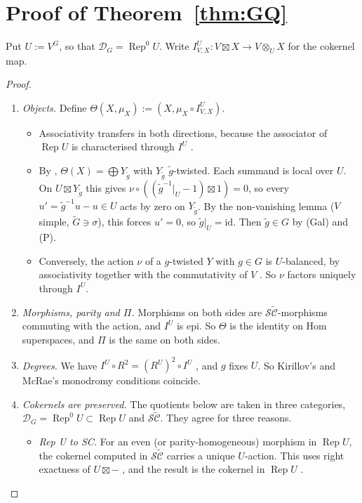 \documentclass[11pt]{article}
\theoremstyle{definition}
\newcommand{\cD}{\mathcal D}
\newcommand{\SC}{\mathcal S\widetilde{\mathcal C}}
\newcommand{\Rep}{\operatorname{Rep}}
\begin{document}
\section{Proof of Theorem~\ref{thm:GQ}}\label{sec:GQ}
Put $U:=V^G$, so that $\cD_G=\Rep^0U$. Write $I^U_{V,X}:V\boxtimes X\to V\otimes_UX$ for the
cokernel map.

\begin{proof}
\begin{enumerate}[nosep]
\item \emph{Objects.} Define $\Theta(X,\mu_X):=(X,\mu_X\circ I^U_{V,X})$.
\begin{itemize}[nosep]
\item Associativity transfers in both directions, because the associator of $\Rep U$ is
characterised through $I^U$ \cite[Thm~2.52]{CKM}.
\item By \cite[Thm~4.15(1)]{McR}, $\Theta(X)=\bigoplus Y_{\tilde g}$ with $Y_{\tilde g}$ $\tilde g$-twisted.
Each summand is local over $U$. On $U\boxtimes Y_{\tilde g}$ this gives
$\nu\circ((\tilde g^{-1}|_U-1)\boxtimes1)=0$, so every $u'=\tilde g^{-1}u-u\in U$ acts by zero on
$Y_{\tilde g}$. By the non-vanishing lemma \cite[Lemma~4.18]{McR} ($V$ simple, $\tilde G\ni\sigma$),
this forces $u'=0$, so $\tilde g|_U=\mathrm{id}$. Then $\tilde g\in G$ by (Gal) and (P).
\item Conversely, the action $\nu$ of a $g$-twisted $Y$ with $g\in G$ is $U$-balanced, by
associativity together with the commutativity of $V$ \cite[Thm~3.42(3)]{CKM}. So $\nu$ factors
uniquely through $I^U$.
\end{itemize}
\item \emph{Morphisms, parity and $\Pi$.} Morphisms on both sides are $\SC$-morphisms commuting
with the action, and $I^U$ is epi. So $\Theta$ is the identity on Hom superspaces, and $\Pi$ is
the same on both sides.
\item \emph{Degrees.} We have $I^U\circ R^2=(R^U)^2\circ I^U$ \cite[eq.~(2.28)]{CKM}, and $g$
fixes $U$. So Kirillov's and McRae's monodromy conditions coincide.
\item \emph{Cokernels are preserved.} The quotients below are taken in three categories,
$\cD_G=\Rep^0U\subset\Rep U$ and $\SC$. They agree for three reasons.
\begin{itemize}[nosep]
\item \emph{Rep U to SC.} For an even (or parity-homogeneous) morphism in $\Rep U$, the cokernel
computed in $\SC$ carries a unique $U$-action. This uses right exactness of $U\boxtimes-$
\cite[Prop.~2.23]{CKM}, and the result is the cokernel in $\Rep U$ \cite[Prop.~2.32]{CKM}.

\end{itemize}
\end{enumerate}
\end{proof}
\end{document}
